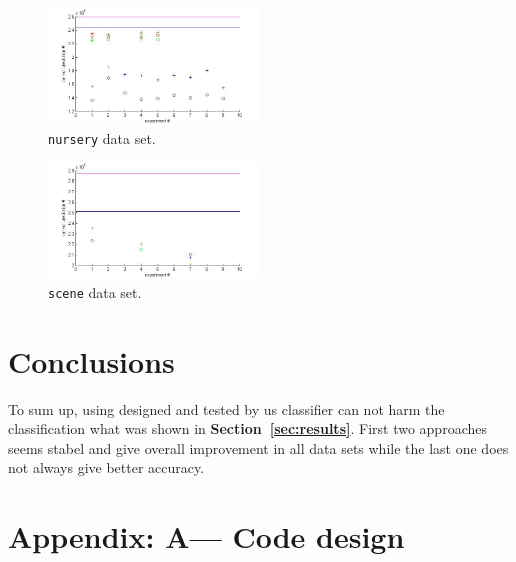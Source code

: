 \documentclass[12pt, a4paper, pdflatex]{report}
\begin{document}
\begin{figure}[htbp]
	\centering
	\includegraphics[width=0.5\textwidth]{graphics/figures/fig2.jpg}
	\begin{tiny}
		\caption{\small \texttt{nursery} data set.\label{img:nursery}}
	\end{tiny}
\end{figure}

\begin{figure}[htbp]
	\centering
	\includegraphics[width=0.5\textwidth]{graphics/figures/fig3.jpg}
	\begin{tiny}
		\caption{\small \texttt{scene} data set.\label{img:scene}}
	\end{tiny}
\end{figure}


\section{Conclusions}
To sum up, using designed and tested by us classifier can not harm the classification what was shown in \textbf{Section~\ref{sec:results}}.
First two approaches seems stabel and give overall improvement in all data sets while the last one does not always  give better accuracy.


\clearpage
\newpage
\section*{Appendix: A--- Code design\label{ap:code}}




{}
\end{document}

